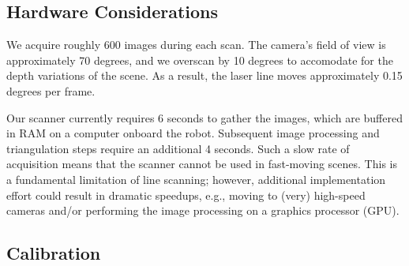 \documentclass[letterpaper, 10 pt, conference]{ieeeconf}  %
\begin{document}
\subsection{Hardware Considerations}

We acquire roughly 600 images during each scan. The camera's field of view is
approximately 70 degrees, and we overscan by 10 degrees to accomodate for the
depth variations of the scene. As a result, the laser line moves approximately
0.15 degrees per frame. 


Our scanner currently requires 6 seconds to gather the images, which are
buffered in RAM on a computer onboard the robot.  Subsequent image processing
and triangulation steps require an additional 4 seconds. Such a slow rate of 
acquisition means that the scanner cannot be used in fast-moving scenes. This
is a fundamental limitation of line scanning; however, additional
implementation effort could result in dramatic speedups, e.g., moving to
(very) high-speed cameras and/or performing the image processing on a graphics
processor (GPU).

\subsection{Calibration}
\end{document}
